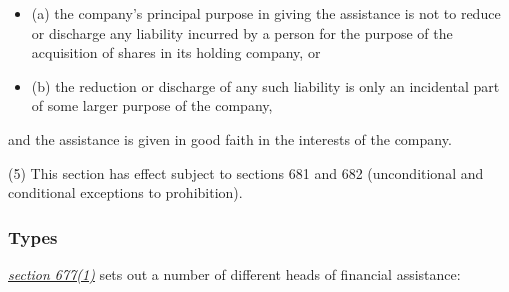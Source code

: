 \documentclass[
]{article}
\providecommand{\tightlist}{%
  \setlength{\itemsep}{0pt}\setlength{\parskip}{0pt}}
\newenvironment{env-99ba4262-5297-4318-9547-86307715f49a}
{
    \savenotes\tcolorbox[blanker,breakable,left=5pt,borderline west={2pt}{-4pt}{green}]
}
{
    \endtcolorbox\spewnotes
}
\begin{document}
\begin{env-99ba4262-5297-4318-9547-86307715f49a}
\begin{itemize}
\tightlist
\item
  (a) the company's principal purpose in giving the assistance is not to
  reduce or discharge any liability incurred by a person for the purpose
  of the acquisition of shares in its holding company, or
\item
  (b) the reduction or discharge of any such liability is only an
  incidental part of some larger purpose of the company,
\end{itemize}

and the assistance is given in good faith in the interests of the
company.

(5) This section has effect subject to sections 681 and 682
(unconditional and conditional exceptions to prohibition).

\end{env-99ba4262-5297-4318-9547-86307715f49a}

\hypertarget{types}{%
\subsubsection{Types}\label{types}}

\emph{\href{https://uk.westlaw.com/8-505-7474?originationContext=document\&transitionType=PLDocumentLink\&contextData=(sc.Default)\&ppcid=52c063520c5f48d8a198d13504dc80c1}{section
677(1)}} sets out a number of different heads of financial assistance:
\end{document}
